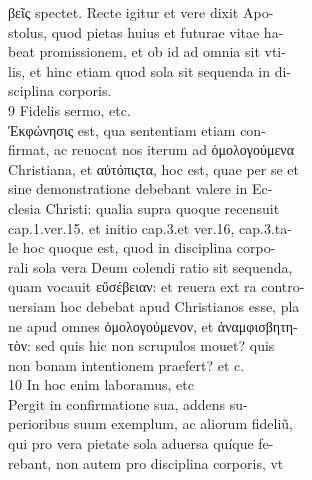 \documentclass{article}
\begin{document}
\begin{pages}
                βεῖς spectet. Recte igitur et vere dixit Apo- \\
                stolus, quod pietas huius et futurae vitae ha- \\
                beat promissionem, et ob id ad omnia sit vti- \\
                lis, et hinc etiam quod sola sit sequenda in di- \\
                sciplina corporis. \\
                9 Fidelis sermo, etc. \\
                Ἐκφώνησις est, qua sententiam etiam con- \\
                firmat, ac reuocat nos iterum ad ὁμολογούμενα \\
                Christiana, et αὐτόπιςτα, hoc est, quae per se et \\
                sine demonstratione debebant valere in Ec- \\
                clesia Christi: qualia supra quoque recensuit \\
                cap.1.ver.15. et initio cap.3.et ver.16, cap.3.ta- \\
                le hoc quoque est, quod in disciplina corpo- \\
                rali sola vera Deum colendi ratio sit sequenda, \\
                quam vocauit εὔσέβειαν: et reuera ext ra contro- \\
                uersiam hoc debebat apud Christianos esse, pla \\
                ne apud omnes ὁμολογούμενον, et ἀναμφισβητη- \\
                τὸν: sed quis hic non scrupulos mouet? quis \\
                non bonam intentionem praefert? et c. \\
                10 In hoc enim laboramus, etc \\
                Pergit in confirmatione sua, addens su- \\
                perioribus suum exemplum, ac aliorum fideliũ, \\
                qui pro vera pietate sola aduersa quíque fe- \\
                rebant, non autem pro disciplina corporis, vt \\

\end{pages}
\end{document}
